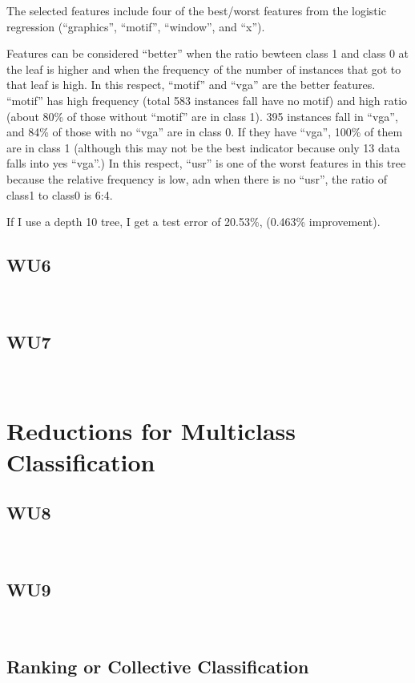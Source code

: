 \documentclass[a4paper,11pt]{article}
\begin{document}
The selected features include four of the best/worst features from
the logistic regression (``graphics'', ``motif'', ``window'', and ``x'').

Features can be considered ``better'' when the ratio bewteen class 1
and class 0 at the leaf is higher and when the frequency of the number
of instances that got to that leaf is high. In this respect, ``motif''
and ``vga'' are the better features. ``motif'' has high frequency
(total 583 instances fall have no motif) and high ratio (about 80\% of
those without ``motif'' are in class 1).  395 instances fall in
``vga'', and 84\% of those with no ``vga'' are in class 0. If they
have ``vga'', 100\% of them are in class 1 (although this may not be the
best indicator because only 13 data falls into yes ``vga''.) 
In this respect, ``usr'' is one of the worst features in this tree
because the relative frequency is low, adn when there is no ``usr'',
the ratio of class1 to class0 is 6:4.

If I use a depth 10 tree, I get a test error of 20.53\%, (0.463\%
improvement).

\subsection{WU6}
\textsf{}\\

\subsection{WU7}
\textsf{}\\

\section{Reductions for Multiclass Classification}
\subsection{WU8}
\textsf{}\\

\subsection{WU9}
\textsf{}\\
\pagebreak
\subsection{Ranking or Collective Classification}
\end{document}
